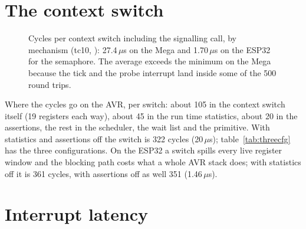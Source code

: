 \section{The context switch}

\begin{figure}[htbp]
\centering
{}
\caption{Cycles per context switch including the signalling call, by mechanism
(tc10, \measDate): 27.4\,$\mu$s on the Mega and 1.70\,$\mu$s on the ESP32 for the
semaphore. The average exceeds the minimum on the Mega because the tick and the probe
interrupt land inside some of the 500 round trips.}
\label{fig:switch}
\end{figure}

Where the cycles go on the AVR, per switch: about 105 in the context switch itself (19
registers each way), about 45 in the run time statistics, about 20 in the assertions,
the rest in the scheduler, the wait list and the primitive. With statistics and
assertions off the switch is 322 cycles (20\,$\mu$s); table~\ref{tab:threecfg} has the
three configurations. On the ESP32 a switch spills every live register window and the
blocking path costs what a whole AVR stack does; with statistics off it is 361 cycles,
with assertions off as well 351 (1.46\,$\mu$s).

\section{Interrupt latency}

